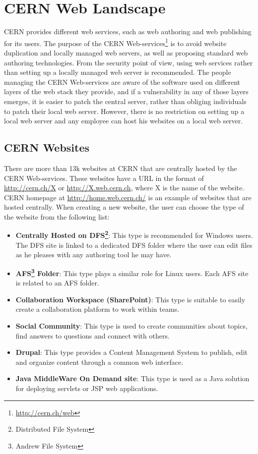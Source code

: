 \section{CERN Web Landscape}
CERN provides different web services, such as web authoring and web publishing for its users. The purpose of the CERN Web-services\footnote{\url{http://cern.ch/web}} is to avoid website duplication and locally managed web servers, as well as proposing standard web authoring technologies. From the security point of view, using web services rather than setting up a locally managed web server is recommended. The people managing the CERN Web-services are aware of the software used on different layers of the web stack they provide, and if a vulnerability in any of those layers emerges, it is easier to patch the central server, rather than obliging individuals to patch their local web server. However, there is no restriction on setting up a local web server and any employee can host his websites on a local web server. 

\subsection{CERN Websites}
There are more than 13k websites at CERN that are centrally hosted by the CERN Web-services. These websites have a URL in the format of \url{http://cern.ch/X} or \url{http://X.web.cern.ch}, where X is the name of the website. CERN homepage at \url{http://home.web.cern.ch/} is an example of websites that are hosted centrally. When creating a new website, the user can choose the type of the website from the following list:
\begin{itemize}
\item \textbf{Centrally Hosted on DFS\footnote{Distributed File System}}: This type is recommended for Windows users. The DFS site is linked to a dedicated DFS folder where the user can edit files as he pleases with any authoring tool he may have.
\item \textbf{AFS\footnote{Andrew File System} Folder}: This type plays a similar role for Linux users. Each AFS site is related to an AFS folder.
\item \textbf{Collaboration Workspace (SharePoint)}: This type is suitable to easily create a collaboration platform to work within teams.
\item \textbf{Social Community}: This type is used to create communities about topics, find answers to questions and connect with others.
\item \textbf{Drupal}: This type provides a Content Management System to publish, edit and organize content through a common web interface.
\item \textbf{Java MiddleWare On Demand site}: This type is used as a Java solution for deploying servlets or JSP web applications.
\end{itemize}
